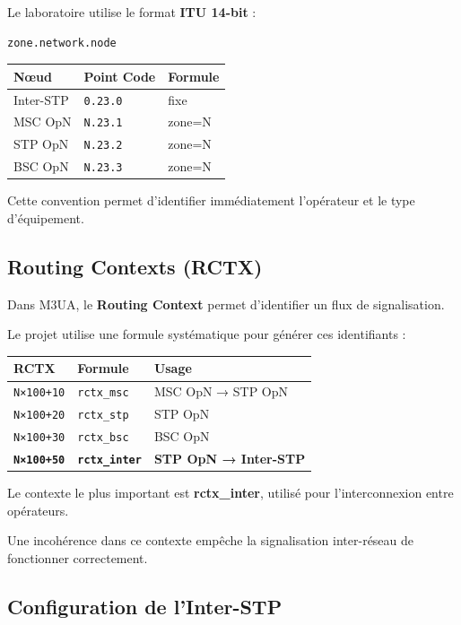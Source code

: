 \documentclass[
  french,
]{article}
\begin{document}
Le laboratoire utilise le format \textbf{ITU 14-bit} :

\begin{verbatim}
zone.network.node
\end{verbatim}

\begin{longtable}[]{@{}lll@{}}
\toprule\noalign{}
Nœud & Point Code & Formule \\
\midrule\noalign{}
\endhead
\bottomrule\noalign{}
\endlastfoot
Inter-STP & \texttt{0.23.0} & fixe \\
MSC OpN & \texttt{N.23.1} & zone=N \\
STP OpN & \texttt{N.23.2} & zone=N \\
BSC OpN & \texttt{N.23.3} & zone=N \\
\end{longtable}

Cette convention permet d'identifier immédiatement l'opérateur et le
type d'équipement.

\subsection{Routing Contexts (RCTX)}\label{routing-contexts-rctx}

Dans M3UA, le \textbf{Routing Context} permet d'identifier un flux de
signalisation.

Le projet utilise une formule systématique pour générer ces identifiants
:

\begin{longtable}[]{@{}lll@{}}
\toprule\noalign{}
RCTX & Formule & Usage \\
\midrule\noalign{}
\endhead
\bottomrule\noalign{}
\endlastfoot
\texttt{N×100+10} & \texttt{rctx\_msc} & MSC OpN → STP OpN \\
\texttt{N×100+20} & \texttt{rctx\_stp} & STP OpN \\
\texttt{N×100+30} & \texttt{rctx\_bsc} & BSC OpN \\
\textbf{\texttt{N×100+50}} & \textbf{\texttt{rctx\_inter}} & \textbf{STP
OpN → Inter-STP} \\
\end{longtable}

Le contexte le plus important est \textbf{rctx\_inter}, utilisé pour
l'interconnexion entre opérateurs.

Une incohérence dans ce contexte empêche la signalisation inter-réseau
de fonctionner correctement.

\subsection{Configuration de
l'Inter-STP}\label{configuration-de-linter-stp}
\end{document}
